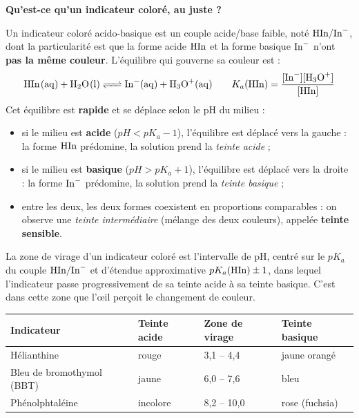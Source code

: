 \documentclass[11pt]{article}
\newcommand{\cle}[1]{{\popxbold\color{popdark}#1}}
\begin{document}
\textbf{Qu'est-ce qu'un indicateur coloré, au juste ?}\par
Un indicateur coloré acido-basique est un couple acide/base faible, noté $\ce{HIn}/\ce{In-}$, dont la particularité est que la forme acide $\ce{HIn}$ et la forme basique $\ce{In-}$ n'ont \textbf{pas la même couleur}. L'équilibre qui gouverne sa couleur est :
\[ \ce{HIn(aq) + H2O(l) <=> In-(aq) + H3O+(aq)} \qquad K_a(\ce{HIn}) = \frac{[\ce{In-}][\ce{H3O+}]}{[\ce{HIn}]} \]
Cet équilibre est \textbf{rapide} et se déplace selon le pH du milieu :
\begin{itemize}
  \item si le milieu est \textbf{acide} ($pH < pK_a - 1$), l'équilibre est déplacé vers la gauche : la forme $\ce{HIn}$ prédomine, la solution prend la \emph{teinte acide} ;
  \item si le milieu est \textbf{basique} ($pH > pK_a + 1$), l'équilibre est déplacé vers la droite : la forme $\ce{In-}$ prédomine, la solution prend la \emph{teinte basique} ;
  \item entre les deux, les deux formes coexistent en proportions comparables : on observe une \emph{teinte intermédiaire} (mélange des deux couleurs), appelée \textbf{teinte sensible}.
\end{itemize}

\begin{definition}
La \cle{zone de virage} d'un indicateur coloré est l'intervalle de pH, centré sur le $pK_a$ du couple $\ce{HIn}/\ce{In-}$ et d'étendue approximative $pK_a(\ce{HIn}) \pm 1$, dans lequel l'indicateur passe progressivement de sa teinte acide à sa teinte basique. C'est dans cette zone que l'œil perçoit le changement de couleur.
\end{definition}

\begin{aretenir}
\begin{center}
\begin{tabularx}{\linewidth}{|l|X|X|X|}
\hline
\rowcolor{popblueL} \textbf{Indicateur} & \textbf{Teinte acide} & \textbf{Zone de virage} & \textbf{Teinte basique} \\
\hline
Hélianthine & rouge & 3,1 -- 4,4 & jaune orangé \\
Bleu de bromothymol (BBT) & jaune & 6,0 -- 7,6 & bleu \\
Phénolphtaléine & incolore & 8,2 -- 10,0 & rose (fuchsia) \\
\hline
\end{tabularx}
\end{center}
\end{aretenir}
\end{document}
